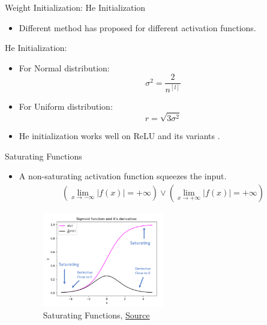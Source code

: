 \documentclass[compress,oilve,t]{beamer}
\newcommand{\tc}[2]{
	\textcolor{#1}{\hspace{-2pt}#2\hspace{-2pt}}
}
\begin{document}
\begin{frame}{Weight Initialization: He Initialization}
	\begin{itemize}
		\item Different method has proposed for different activation functions.
	\end{itemize}
	\begin{block}{He Initialization:}
		\begin{itemize}
			\item For Normal distribution:
			\[
			\sigma^2 = \frac{2}{n^{[l]}}
			\]
			\item For Uniform distribution:
			\[
			r = \sqrt{3\sigma^2}
			\]
		\end{itemize}
	\end{block}
	\begin{itemize}
		\medskip
		\medskip
		\item He initialization works well on \tc{keywords}{ReLU and its variants}.
	\end{itemize}
\end{frame}


\DeclarePairedDelimiter\abs{\lvert}{\rvert}%
\begin{frame}{Saturating Functions}
	\begin{itemize}
		\item A  \tc{keywords}{non-saturating} activation function squeezes the input.
		\begin{align*}
			(\lim_{x \to -\infty}|f(x)|=+\infty)
			\vee (\lim_{x \to +\infty}|f(x)|=+\infty)
		\end{align*}
		\begin{figure}[H]
			\centering
			\includegraphics[width=0.5\textwidth]{Figs/van_1.png}
			\caption{Saturating Functions, \href{https://www.analyticsvidhya.com/blog/2021/06/the-challenge-of-vanishing-exploding-gradients-in-deep-neural-networks/}{Source}}
		\end{figure}
	\end{itemize}
\end{frame}
\end{document}
